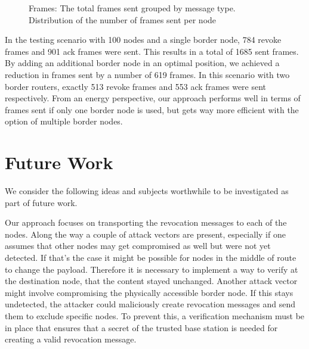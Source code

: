 \documentclass[conference]{IEEEtran}
\begin{document}
\begin{figure}[htbp]
	\caption{Frames: \protect{} The total frames sent grouped by message type. \protect{} Distribution of the number of frames sent per node}
	\label{fig:frames}
\end{figure}

In the testing scenario with 100 nodes and a single border node, 784 revoke frames and 901 ack frames were sent.
This results in a total of 1685 sent frames.
By adding an additional border node in an optimal position, we achieved a reduction in frames sent by a number of 619 frames.
In this scenario with two border routers, exactly 513 revoke frames and 553 ack frames were sent respectively.
From an energy perspective, our approach performs well in terms of frames sent if only one border node is used, but gets way more efficient with the option of multiple border nodes.

\section{Future Work}\label{sec:future_work}

We consider the following ideas and subjects worthwhile to be investigated as part of future work.

Our approach focuses on transporting the revocation messages to each of the nodes.
Along the way a couple of attack vectors are present, especially if one assumes that other nodes may get compromised as well but were not yet detected.
If that's the case it might be possible for nodes in the middle of route to change the payload.
Therefore it is necessary to implement a way to verify at the destination node, that the content stayed unchanged.
Another attack vector might involve compromising the physically accessible border node.
If this stays undetected, the attacker could maliciously create revocation messages and send them to exclude specific nodes.
To prevent this, a verification mechanism must be in place that ensures that a secret of the trusted base station is needed for creating a valid revocation message.
\end{document}
